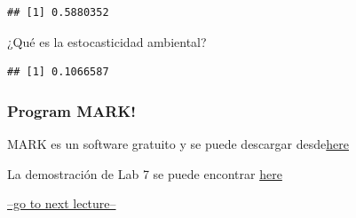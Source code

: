 \documentclass[
]{article}
\newenvironment{Shaded}{\begin{snugshade}}{\end{snugshade}}
\newcommand{\CommentTok}[1]{\textcolor[rgb]{0.56,0.35,0.01}{\textit{#1}}}
\newcommand{\DocumentationTok}[1]{\textcolor[rgb]{0.56,0.35,0.01}{\textbf{\textit{#1}}}}
\newcommand{\FunctionTok}[1]{\textcolor[rgb]{0.00,0.00,0.00}{#1}}
\newcommand{\NormalTok}[1]{#1}
\newcommand{\SpecialCharTok}[1]{\textcolor[rgb]{0.00,0.00,0.00}{#1}}
\begin{document}
\begin{Shaded}
\end{Shaded}

\begin{verbatim}
## [1] 0.5880352
\end{verbatim}

¿Qué es la estocasticidad ambiental?

\begin{Shaded}
\end{Shaded}

\begin{verbatim}
## [1] 0.1066587
\end{verbatim}

\hypertarget{program-mark-1}{%
\subsubsection{Program MARK!}\label{program-mark-1}}

MARK es un software gratuito y se puede descargar
desde\href{http://warnercnr.colostate.edu/~gwhite/mark/mark.htm}{here}

La demostración de Lab 7 se puede encontrar
\href{LAB7.html\#open-population_models}{here}

\href{LECTURE16.html}{--go to next lecture--}
\end{document}
